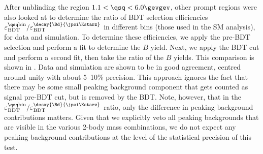 After unblinding the region $1.1<\qsq<6.0\gevgev$, other prompt \qsq regions were also looked at to
determine the ratio of BDT selection efficiencies
$\varepsilon_\mathrm{BDT}^\mathrm{\qsq bin} / \varepsilon_\mathrm{BDT}^{\decay{\Bd}{\jpsi\Kstarz}}$
in different \qsq bins (those used in the SM analysis), for data and simulation.
To determine these efficiencies, we apply the pre-BDT selection and perform a fit to determine the $B$ yield.  Next, we apply the BDT cut and perform a second fit, then take the ratio of the $B$ yields.
This comparison is shown in .
Data and simulation are shown to be in good agreement, centred around unity with about 5--10\% precision.
This approach ignores the fact that there may be some small peaking background component that gets counted as signal pre-BDT cut, but is removed by the BDT.  Note, however, that in the $\varepsilon_\mathrm{BDT}^\mathrm{\qsq bin} / \varepsilon_\mathrm{BDT}^{\decay{\Bd}{\jpsi\Kstarz}}$ ratio, only the difference in peaking background contributions matters.  Given that we explicitly veto all peaking backgrounds that are visible in the various 2-body mass combinations, we do not expect any peaking background contributions at the level of the statistical precision of this test.


